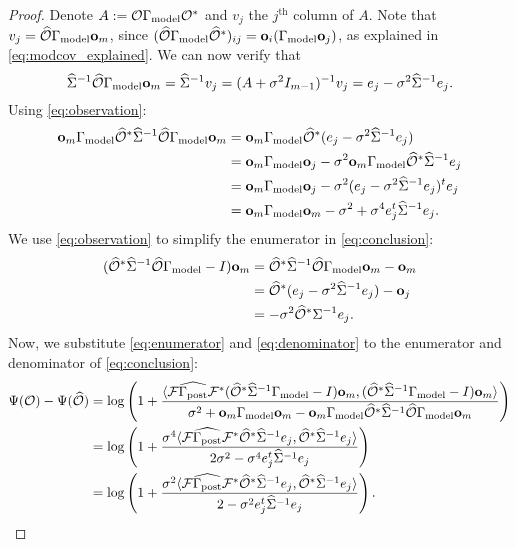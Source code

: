\begin{proof} \label{cor:same_meas_proof}
  Denote $A:= \mathcal{O} \Gamma_{\textup{model}} \mathcal{O}^*$ and $v_j$ the $j^{\text{th}}$
  column of $A$.  Note that $v_j = \widehat{\mathcal{O}} \Gamma_{\textup{model}} \mathbf{o}_m$, since
  $(\widehat{\mathcal{O}} \Gamma_{\textup{model}} \widehat{\mathcal{O}}^*)_{ij} = \mathbf{o}_i(\Gamma_{\textup{model}} \mathbf{o}_j)$, as
  explained in \eqref{eq:modcov_explained}. We can now verify that
  \begin{equation}\label{eq:observation}
    \Sigmam^{-1} \obsm \modcov \meas_m = \Sigmam^{-1}v_j = (A +\sigma^2I_{m-1})^{-1} v_j =
    e_j -\sigma^2 \Sigmam^{-1}e_j.
  \end{equation}
  Using \eqref{eq:observation}:
  \begin{align}\label{eq:denominator}
    \begin{split}
      \meas_m \modcov \obsm^* \Sigmam^{-1} \obsm \modcov \meas_m
      &= \meas_m \modcov \obsm^* ( e_j - \sigma^2 \Sigmam^{-1} e_j )\\
      &= \meas_m \modcov \meas_j - \sigma^2 \meas_m \modcov \obsm^* \Sigmam^{-1}e_j \\
      &= \meas_m \modcov \meas_j -\sigma^2 (e_j - \sigma^2 \Sigmam^{-1}e_j)^t e_j \\
      &= \meas_m \modcov \meas_m -\sigma^2 + \sigma^4 e_j^t\Sigmam^{-1}e_j.
    \end{split}
  \end{align}
  We use \eqref{eq:observation} to simplify the enumerator in
  \eqref{eq:conclusion}:
  \begin{align}\label{eq:enumerator}
    \begin{split}
      (\obsm^* \Sigmam^{-1} \obsm \modcov - I ) \meas_m
      &= \obsm^* \Sigmam^{-1} \obsm \modcov \meas_m - \meas_m \\
      &= \obsm^* (e_j - \sigma^2 \Sigmam^{-1} e_j) -\meas_j \\ 
      &= -\sigma^2 \obsm^* \Sigma^{-1}e_j. 
    \end{split}
  \end{align}
  Now, we substitute \eqref{eq:enumerator} and \eqref{eq:denominator}
  to the enumerator and denominator of \eqref{eq:conclusion}:
  \begin{align*}
    \tar( \obs ) - \tar (\obsm ) &=
    \log \left ( 1 + \frac{
      \langle \fwd \postcovm \fwd^* (\obsm^* \Sigmam^{-1} \modcov - I ) \meas_m,
      (\obsm^* \Sigmam^{-1} \modcov - I ) \meas_m \rangle
    }{
      \sigma^2 + \meas_m \modcov \meas_m - \meas_m \modcov \obsm^* \Sigmam^{-1} \obsm \modcov \meas_m 
    }       
    \right ) \\
    &= \log \left ( 1 + \frac{\sigma^4
      \langle \fwd \postcovm \fwd^* \obsm^* \Sigmam^{-1} e_j,
      \obsm^* \Sigmam^{-1}e_j \rangle
    }{
      2\sigma^2 - \sigma^4 e_j^t\Sigmam^{-1}e_j 
    }       
    \right ) \\
    &= \log \left ( 1 + \frac{\sigma^2
      \langle \fwd \postcovm \fwd^* \obsm^* \Sigmam^{-1} e_j,
      \obsm^* \Sigmam^{-1}e_j \rangle
    }{
      2 - \sigma^2 e_j^t\Sigmam^{-1}e_j 
    }       
    \right ).
  \end{align*}
\end{proof}


